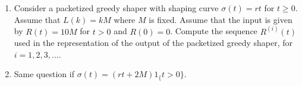 \begin{problem}
\begin{enumerate}
  \item Consider a packetized greedy shaper with shaping curve
  $\sigma(t)=rt$ for $t \geq 0$. Assume that $L(k)= k M$ where $M$ is fixed.
  Assume that the input is given by $R(t)=10 M$ for $t>0$ and $R(0)=0$. Compute
  the sequence $R^{(i)}(t)$ used in the representation of the output of the
  packetized greedy shaper, for $i=1,2,3,...$.
  \item Same question if $\sigma(t)=(rt+ 2M) 1_\{t>0\}$.
\end{enumerate}

\end{problem}
